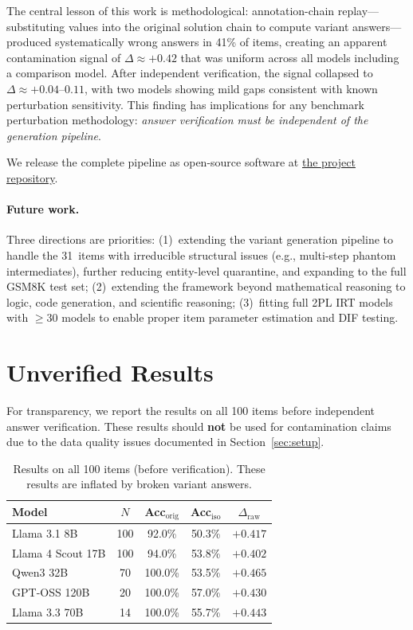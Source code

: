 \documentclass[11pt,a4paper]{article}
\begin{document}
The central lesson of this work is methodological: annotation-chain
replay---substituting values into the original solution chain to compute
variant answers---produced systematically wrong answers in 41\% of
items, creating an apparent contamination signal of
$\Delta \approx +0.42$ that was uniform across all models including a
comparison model. After independent verification, the signal collapsed
to $\Delta \approx +0.04$--$0.11$, with two models showing mild gaps
consistent with known perturbation sensitivity. This finding
has implications for any benchmark perturbation methodology:
\emph{answer verification must be independent of the generation
pipeline}.

We release the complete pipeline as open-source software at
\href{https://github.com/testofschool/isomorph-eval}{the project repository}.

\paragraph{Future work.}
Three directions are priorities: (1)~extending the variant generation
pipeline to handle the 31~items with irreducible structural issues
(e.g., multi-step phantom intermediates), further reducing entity-level
quarantine, and expanding to the full
GSM8K test set; (2)~extending the framework beyond mathematical
reasoning to logic, code generation, and scientific reasoning;
(3)~fitting full 2PL IRT models with $\geq 30$ models to enable
proper item parameter estimation and DIF testing.




\appendix
\section{Unverified Results}
\label{app:unverified}

For transparency, we report the results on all 100 items before
independent answer verification. These results should \textbf{not} be
used for contamination claims due to the data quality issues documented
in Section~\ref{sec:setup}.

\begin{table}[h]
\centering
\small
\caption{Results on all 100 items (before verification). These results are inflated by broken variant answers.}
\begin{tabular}{lcccc}
\toprule
Model & $N$ & Acc$_{\mathrm{orig}}$ & Acc$_{\mathrm{iso}}$ & $\Delta_{\mathrm{raw}}$ \\
\midrule
Llama 3.1 8B & 100 & 92.0\% & 50.3\% & $+0.417$ \\
Llama 4 Scout 17B & 100 & 94.0\% & 53.8\% & $+0.402$ \\
Qwen3 32B & 70 & 100.0\% & 53.5\% & $+0.465$ \\
GPT-OSS 120B & 20 & 100.0\% & 57.0\% & $+0.430$ \\
Llama 3.3 70B & 14 & 100.0\% & 55.7\% & $+0.443$ \\
\bottomrule
\end{tabular}
\end{table}
\end{document}
